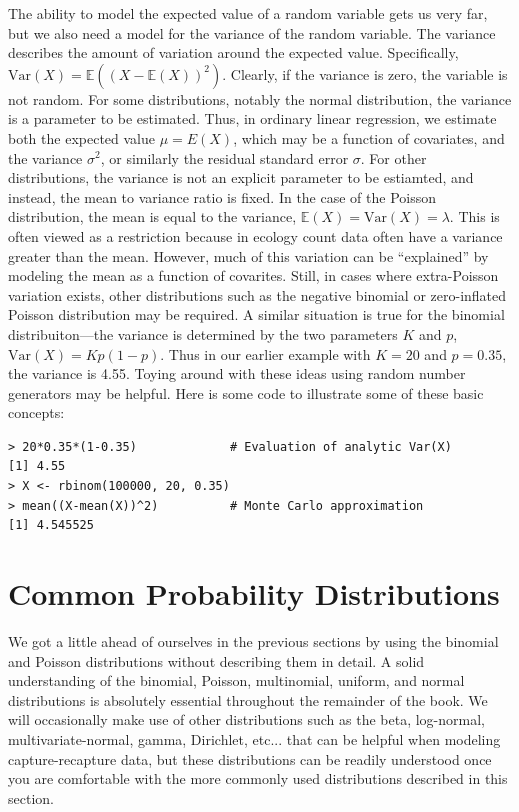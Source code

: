 The ability to model the expected value of a random variable gets us
very far, but we also need a model for the variance of the random
variable. The variance %
describes the amount of variation around the expected
value. Specifically, $\text{Var}(X) = \mathbb{E}((X -
\mathbb{E}(X))^2)$. Clearly, if the variance is zero, the variable is
not random.
For some distributions, notably the normal distribution, the variance
is a parameter to be estimated. Thus, in ordinary linear regression,
we estimate both the expected value $\mu=E(X)$,
which may be a function of covariates, and the variance
$\sigma^2$, or similarly the residual standard error $\sigma$. For
other distributions, the variance is not an explicit parameter to be
estiamted, and instead, the mean to variance ratio is fixed. In the
case of the Poisson distribution, the mean is equal to the
variance, $\mathbb{E}(X) = \text{Var}(X) = \lambda$. This is often viewed as a restriction because in ecology
count data often have a variance greater than the mean. However, much
of this variation can be ``explained'' by modeling the mean as a
function of covarites. Still, in cases where extra-Poisson variation
exists, other distributions such as the negative binomial or
zero-inflated Poisson distribution may be required. A similar
situation is true for the binomial distribuiton---the variance is
determined by the two parameters $K$ and $p$, $\text{Var}(X) = Kp(1-p)$. Thus
in our earlier example with $K=20$ and $p=0.35$, the variance is
4.55. Toying around with these ideas using random number generators
may be helpful. Here is some code to illustrate some of these basic concepts:
\begin{verbatim}
> 20*0.35*(1-0.35)             # Evaluation of analytic Var(X)
[1] 4.55
> X <- rbinom(100000, 20, 0.35)
> mean((X-mean(X))^2)          # Monte Carlo approximation
[1] 4.545525
\end{verbatim}



\section{Common Probability Distributions}
\label{sec.modeling.distributions}

We got a little ahead of ourselves in the previous sections by using
the binomial and Poisson distributions without describing them in detail.
A solid understanding of the binomial, Poisson, multinomial, uniform,
and normal distributions is absolutely essential throughout the
remainder of the book. We will occasionally make use of other
distributions such as the beta, log-normal, multivariate-normal,
gamma, Dirichlet, etc... that can be helpful when
modeling capture-recapture data, but these distributions can be
readily understood once you are comfortable with the more commonly
used distributions described in this section.

